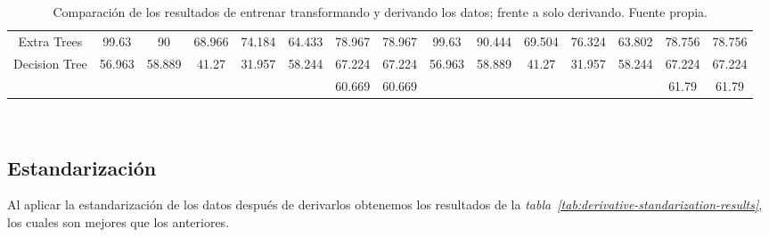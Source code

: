 \begin{table}[!h]
{\begin{tabular}{|c|ccccccc|ccccccc|}
            Extra Trees & 99.63 & 90 & 68.966 & 74.184 & 64.433 & 78.967 & 78.967 & 99.63 & 90.444 & 69.504 & 76.324 & 63.802 & 78.756 & 78.756 \\
            Decision Tree & 56.963 & 58.889 & 41.27 & 31.957 & 58.244 & 67.224 & 67.224 & 56.963 & 58.889 & 41.27 & 31.957 & 58.244 & 67.224 & 67.224 \\ \hline
            & & & & & & 60.669 & 60.669 & & & & & & 61.79 & 61.79 \\ \hline
        \end{tabular}}
    \caption{Comparación de los resultados de entrenar transformando y derivando los datos; frente a solo derivando. Fuente propia.}\ \label{tab:derivative-transformed-results}
\end{table}

\subsection{Estandarización}

Al aplicar la estandarización de los datos después de derivarlos obtenemos los resultados de la \textit{tabla\ \ref{tab:derivative-standarization-results}}, los cuales son mejores que los anteriores.


